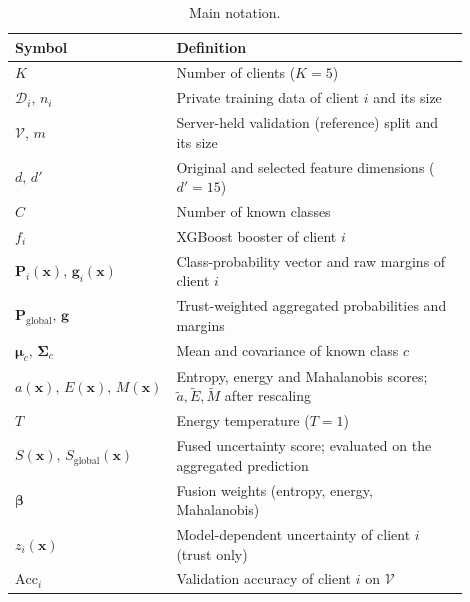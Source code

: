 \documentclass[pdflatex,sn-mathphys-num]{sn-jnl}
\begin{document}
{\begin{table}[htbp]\scriptsize
\color{black}
\centering
\caption{Main notation.}
\label{tab:notation}
\begin{tabular}{@{}p{0.25\linewidth}p{0.65\linewidth}@{}}
\toprule
\textbf{Symbol} & \textbf{Definition} \\
\midrule

$K$ &
Number of clients ($K=5$) \\

$\mathcal{D}_i,\,n_i$ &
Private training data of client $i$ and its size \\

$\mathcal{V},\,m$ &
Server-held validation (reference) split and its size \\

$d,\,d'$ &
Original and selected feature dimensions ($d'=15$) \\

$C$ &
Number of known classes \\

$f_i$ &
XGBoost booster of client $i$ \\

$\mathbf{P}_i(\mathbf{x}),\,\mathbf{g}_i(\mathbf{x})$ &
Class-probability vector and raw margins of client $i$ \\

$\mathbf{P}_{\mathrm{global}},\,\mathbf{g}$ &
Trust-weighted aggregated probabilities and margins \\

$\boldsymbol{\mu}_c,\,\boldsymbol{\Sigma}_c$ &
Mean and covariance of known class $c$ \\

$a(\mathbf{x}),\,E(\mathbf{x}),\,M(\mathbf{x})$ &
Entropy, energy and Mahalanobis scores; $\tilde a,\tilde E,\tilde M$ after rescaling \\

$T$ &
Energy temperature ($T=1$) \\

$S(\mathbf{x}),\,S_{\mathrm{global}}(\mathbf{x})$ &
Fused uncertainty score; evaluated on the aggregated prediction \\

$\boldsymbol{\beta}$ &
Fusion weights (entropy, energy, Mahalanobis) \\

$z_i(\mathbf{x})$ &
Model-dependent uncertainty of client $i$ (trust only) \\

$\mathrm{Acc}_i$ &
Validation accuracy of client $i$ on $\mathcal{V}$ \\


\end{tabular}
\end{table}}
\end{document}
